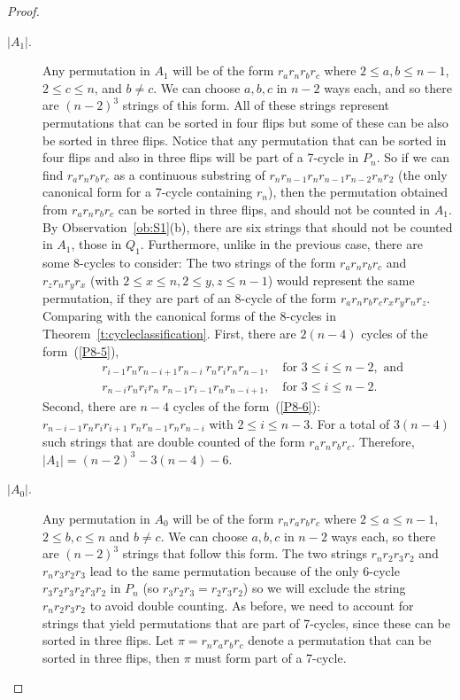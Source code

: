 \documentclass[final]{dmtcs-episciences}
\numberwithin{equation}{section}
\begin{document}
\begin{proof}
\begin{description}
\item[$|A_1|$.] Any permutation in $A_1$ will be of the form $r_a r_n r_b r_c$ where $2 \leq a,b \leq n-1$, $2 \leq c \leq n$, and $b\neq c$. We can choose $a, b, c$ in $n-2$ ways each, and so there are $(n-2)^3$ strings of this form. All of these strings represent permutations that can be sorted in four flips but some of these can be also be sorted in three flips. Notice that any permutation that can be sorted in four flips and also in three flips will be part of a 7-cycle in $P_n$. So if we can find $r_a r_n r_b r_c$ as a continuous substring of $r_n r_{n-1} r_n r_{n-1} r_{n-2} r_n r_2$ (the only canonical form for a 7-cycle containing $r_n$), then the permutation obtained from $r_a r_n r_b r_c$ can be sorted in three flips, and should not be counted in $A_1$. By Observation~\ref{ob:S1}(b), there are six strings that should not be counted in $A_1$, those in $Q_1$. Furthermore, unlike in the previous case, there are some 8-cycles to consider: The two strings of the form $r_a r_n r_b r_c$ and $r_z r_n r_y r_x$ (with $2\leq x\leq n, 2\leq y,z\leq n-1$) would represent the same permutation, if they are part of an 8-cycle of the form $r_a r_n r_b r_c r_x r_y r_n r_z$. Comparing with the canonical forms of the 8-cycles in Theorem~\ref{t:cycleclassification}. First, there are $2(n-4)$ cycles of the form~(\ref{P8-5}),
\begin{align*}
&r_{i-1} r_n r_{n-i+1} r_{n-i} \ r_n r_i r_n r_{n-1}, \quad \text{for } 3 \leq i \leq n-2, \text{ and}\\
&r_{n-i} r_n r_{i} r_{n} \ r_{n-1} r_{i-1} r_n r_{n-i+1}, \quad \text{for } 3 \leq i \leq n-2.
\end{align*}
Second, there are $n-4$ cycles of the form~(\ref{P8-6}): $r_{n-i-1} r_n r_{i} r_{i+1} \ r_{n} r_{n-1} r_n r_{n-i}$  with $2 \leq i \leq n-3$. For a total of $3(n-4)$ such strings that are double counted of the form $r_ar_nr_br_c$. Therefore, $|A_1| = (n-2)^3-3(n-4)-6$.
\item[$|A_0|$.] Any permutation in $A_0$ will be of the form $r_n r_a r_b r_c$ where $2 \leq a \leq n-1$, $2 \leq b,c \leq n$ and $b\neq c$. We can choose $a, b, c$ in $n-2$ ways each, so there are $(n-2)^3$ strings that follow this form. The two strings $r_n r_2 r_3 r_2 $ and $r_n r_3 r_2 r_3 $ lead to the same permutation because of the only 6-cycle $r_3r_2r_3r_2r_3r_2$ in $P_n$ (so $r_3r_2r_3=r_2r_3r_2$) so we will exclude the string $r_n r_2 r_3 r_2$ to avoid double counting. As before, we need to account for strings that yield permutations that are part of 7-cycles, since these can be sorted in three flips.  Let $\pi=r_n r_a r_b r_c$ denote a permutation that can be sorted in three flips, then $\pi$ must form part of a 7-cycle. %

\end{description}
\end{proof}
\end{document}
